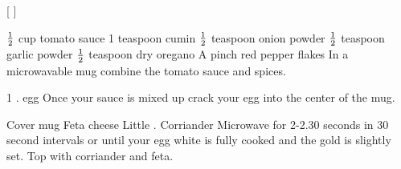 
[
]

\begin{step}
$\frac{1}{2}$ cup tomato sauce
1 teaspoon cumin
$\frac{1}{2}$ teaspoon onion powder
$\frac{1}{2}$ teaspoon garlic powder
$\frac{1}{2}$ teaspoon dry oregano
A pinch red pepper flakes
\method
In a microwavable mug combine the tomato sauce and spices.
\end{step}

\begin{step}
1 . egg
\method
Once your sauce is mixed up crack your egg into the center of the mug.
\end{step}

\begin{step}
Cover mug Feta cheese
Little . Corriander
\method
Microwave for 2-2.30 seconds in 30 second intervals or until your egg white is fully cooked and the gold is slightly set. Top with corriander and feta.
\end{step}